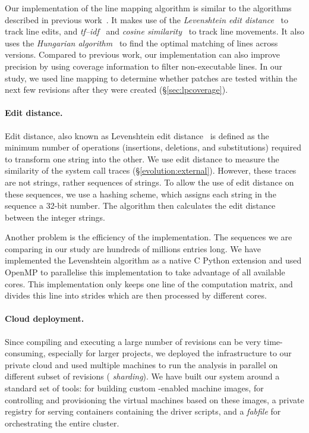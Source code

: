Our implementation of the line mapping algorithm is similar to the
algorithms described in previous
work~\cite{szz:msr05,szz:ase06,change-source-code:msr07,szzrevisited:defects08}.
It makes use of the \emph{Levenshtein edit
  distance}~\cite{levenshtein1966binary} to track line edits, and
\emph{tf--idf}~\cite{tf-idf} and \emph{cosine
  similarity}~\cite{cosinesimilarity} to track line movements.  It
also uses the \emph{Hungarian algorithm}~\cite{hungarian} to find the
optimal matching of lines across versions.  Compared to previous work,
our implementation can also improve precision by using coverage information to filter
non-executable lines.
In our study, we used line mapping to determine whether patches are
tested within the next few revisions after they were created
(\S\ref{sec:lpcoverage}).

\paragraph{Edit distance.} Edit distance, also known as Levenshtein edit
distance~\cite{levenshtein1966binary} is defined as the minimum number of
operations (insertions, deletions, and substitutions) required to transform one
string into the other. We use edit distance to measure the similarity of the
system call traces (\S\ref{evolution:external}). However, these traces are
not strings, rather sequences of strings. To allow the use of edit distance on
these sequences, we use a hashing scheme, which assigns each string in the
sequence a 32-bit number. The algorithm then calculates the edit distance between
the integer strings.

Another problem is the efficiency of the implementation. The sequences we are
comparing in our study are hundreds of millions entries long. We have
implemented the Levenshtein algorithm as a native C Python extension and used
OpenMP to parallelise this implementation to take advantage of all available
cores. This implementation only keeps one line of the computation matrix, and
divides this line into strides which are then processed by different cores.

\paragraph{Cloud deployment.} Since compiling and executing a large number of
revisions can be very time-consuming, especially for larger projects, we
deployed the infrastructure to our private cloud and used multiple machines to
run the analysis in parallel on different subset of revisions (\ie
\emph{sharding}). We have built our system around a standard set of tools:
\packer for building custom \docker-enabled machine images, \vagrant for
controlling and provisioning the virtual machines based on these images, a
private \docker registry for serving \docker containers containing the driver
scripts, and a \emph{fabfile} for orchestrating the entire cluster.

